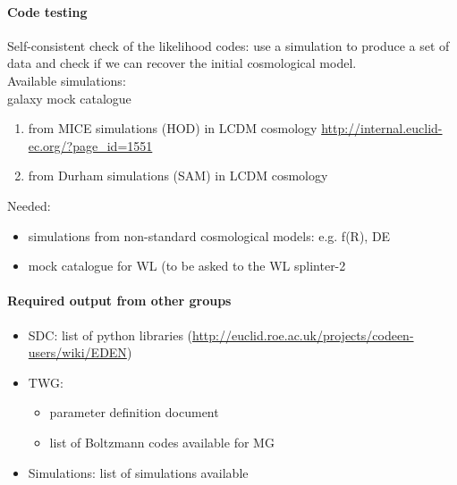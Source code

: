 \paragraph{Code testing}
Self-consistent check of the likelihood codes:  use a simulation to produce a set of data and check if we can recover the initial cosmological model.\\
Available simulations: \\
galaxy mock catalogue
\begin{enumerate}
 \item from MICE simulations (HOD) in LCDM cosmology  \url{http://internal.euclid-ec.org/?page_id=1551}
 \item from Durham simulations (SAM) in LCDM cosmology 
\end{enumerate}
Needed:
\begin{itemize}
 \item simulations from non-standard cosmological models: e.g. f(R), DE 
 \item mock catalogue for WL (to be asked to the WL splinter-2
\end{itemize}


\paragraph{Required output from other groups}
\begin{itemize}
 \item SDC: list of python libraries (\url{http://euclid.roe.ac.uk/projects/codeen-users/wiki/EDEN})
 \item TWG:
 \begin{itemize}
  \item parameter definition document
  \item list of Boltzmann codes available for MG
 \end{itemize}
 \item Simulations: list of simulations available
\end{itemize}





%



